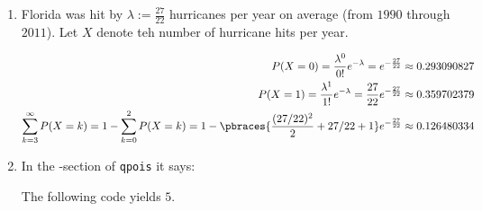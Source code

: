 \begin{solution}

\phantom{}

\begin{enumerate}[label = (\alph*)]

    \item Florida was hit by $\lambda := \frac{27}{22}$ hurricanes per year on average (from $1990$ through $2011$).
    Let $X$ denote teh number of hurricane hits per year.

    \begin{align}
        P(X = 0)
        =
        \frac{\lambda^0}{0!} e^{-\lambda}
        =
        e^{-\frac{27}{22}}
        \approx
        0.293090827 \\
        P(X = 1)
        =
        \frac{\lambda^1}{1!} e^{-\lambda}
        =
        \frac{27}{22} e^{-\frac{27}{22}}
        \approx
        0.359702379 \\
        \sum_{k=3}^\infty P(X = k)
        =
        1 - \sum_{k=0}^2 P(X = k)
        =
        1 - \pbraces
        {
            \frac{(27 / 22)^2}{2} + 27 / 22 + 1
        }
        e^{-\frac{27}{22}}
        \approx
        0.126480334
    \end{align}

    \item In the -section of \texttt{qpois} it says:

    The following code yields $5$.

    \lstset{style = fundament}
    

\end{enumerate}

\end{solution}

